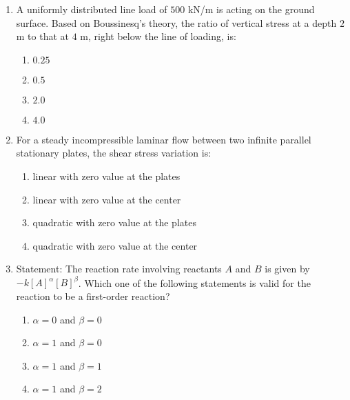 \documentclass[journal,9pt,onecolumn]{IEEEtran}
\begin{document}
\begin{enumerate}
\item A uniformly distributed line load of $500$ kN/m is acting on the ground surface. Based on Boussinesq's theory, the ratio of vertical stress at a depth $2$ m to that at $4$ m, right below the line of loading, is:
\begin{multicols}{4}
\begin{enumerate}
    \item $0.25$
    \item $0.5$
    \item $2.0$
    \item $4.0$
\end{enumerate}
\end{multicols}

\item For a steady incompressible laminar flow between two infinite parallel stationary plates, the shear stress variation is:
\begin{multicols}{2}
\begin{enumerate}
    \item linear with zero value at the plates
    \item linear with zero value at the center
    \item quadratic with zero value at the plates
    \item quadratic with zero value at the center
\end{enumerate}
\end{multicols}


\item Statement: The reaction rate involving reactants $A$ and $B$ is given by $-k[A]^{\alpha}[B]^{\beta}$. Which one of the following statements is valid for the reaction to be a first-order reaction?
\begin{multicols}{4}
\begin{enumerate}
    \item $\alpha = 0$ and $\beta = 0$
    \item $\alpha = 1$ and $\beta = 0$
    \item $\alpha = 1$ and $\beta = 1$
    \item $\alpha = 1$ and $\beta = 2$
\end{enumerate}
\end{multicols}
\end{enumerate}
\end{document}

